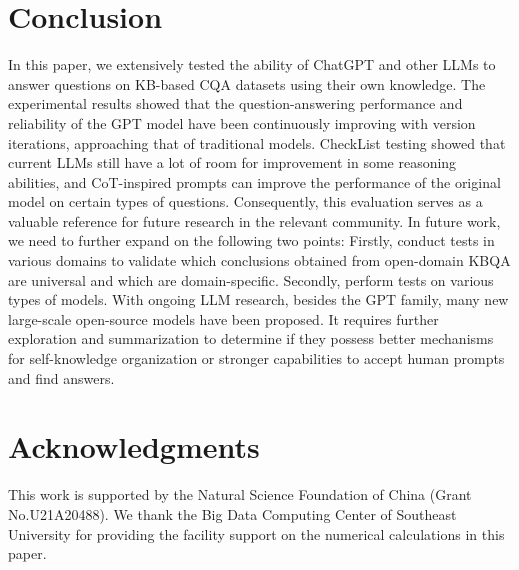 \documentclass[runningheads]{llncs}
\begin{document}
\section{Conclusion}
In this paper, we extensively tested the ability of ChatGPT and other LLMs to answer questions on KB-based CQA datasets using their own knowledge. 
The experimental results showed that the question-answering performance and reliability of the GPT model have been continuously improving with version iterations, approaching that of traditional models. CheckList testing showed that current LLMs still have a lot of room for improvement in some reasoning abilities, and CoT-inspired prompts can improve the performance of the original model on certain types of questions. Consequently, this evaluation serves as a valuable reference for future research in the relevant community.
In future work, we need to further expand on the following two points: Firstly, conduct tests in various domains to validate which conclusions obtained from open-domain KBQA are universal and which are domain-specific. Secondly, perform tests on various types of models. With ongoing LLM research, besides the GPT family, many new large-scale open-source models have been proposed. It requires further exploration and summarization to determine if they possess better mechanisms for self-knowledge organization or stronger capabilities to accept human prompts and find answers.


\section{Acknowledgments}
This work is supported by the Natural Science Foundation of China (Grant No.U21A20488). We thank the Big Data Computing Center of Southeast University for providing the facility support on the numerical calculations in this paper.






\end{document}
